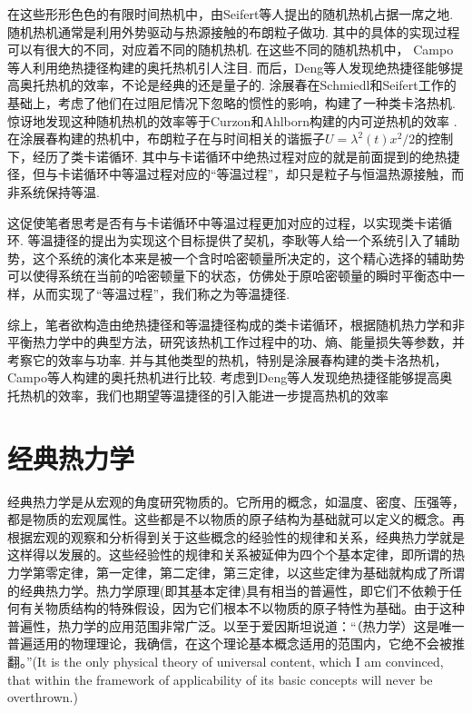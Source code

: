 在这些形形色色的有限时间热机中，由Seifert等人提出的随机热机\cite{Schmiedl2008}占据一席之地. 随机热机通常是利用外势驱动与热源接触的布朗粒子做功. 其中的具体的实现过程可以有很大的不同，对应着不同的随机热机. 在这些不同的随机热机中， Campo等人利用绝热捷径构建的奥托热机\cite{DelCampo2014}引人注目. 而后，Deng等人发现绝热捷径能够提高奥托热机的效率，不论是经典的还是量子的.\cite{Deng2013} 涂展春在Schmiedl和Seifert工作\cite{Schmiedl2008}的基础上，考虑了他们在过阻尼情况下忽略的惯性的影响，构建了一种类卡洛热机\cite{Tu2013}. 惊讶地发现这种随机热机的效率等于Curzon和Ahlborn构建的内可逆热机\cite{Curzon1975}的效率 . 在涂展春构建的热机中\cite{Tu2013}，布朗粒子在与时间相关的谐振子$U=\lambda ^2\left( t \right) x^2/2$的控制下，经历了类卡诺循环. 其中与卡诺循环中绝热过程对应的就是前面提到的绝热捷径，但与卡诺循环中等温过程对应的“等温过程”，却只是粒子与恒温热源接触，而非系统保持等温. 

这促使笔者思考是否有与卡诺循环中等温过程更加对应的过程，以实现类卡诺循环. 等温捷径\cite{Li2016}的提出为实现这个目标提供了契机，李耿等人给一个系统引入了辅助势，这个系统的演化本来是被一个含时哈密顿量所决定的，这个精心选择的辅助势可以使得系统在当前的哈密顿量下的状态，仿佛处于原哈密顿量的瞬时平衡态中一样，从而实现了“等温过程”，我们称之为等温捷径.

综上，笔者欲构造由绝热捷径和等温捷径构成的类卡诺循环，根据随机热力学和非平衡热力学中的典型方法，研究该热机工作过程中的功、熵、能量损失等参数，并考察它的效率与功率. 并与其他类型的热机，特别是涂展春构建的类卡洛热机\cite{Tu2013}，Campo等人构建的奥托热机\cite{DelCampo2014}进行比较. 考虑到Deng等人发现绝热捷径能够提高奥托热机的效率\cite{Deng2013}，我们也期望等温捷径的引入能进一步提高热机的效率


\section{经典热力学}

\quad 经典热力学是从宏观的角度研究物质的。它所用的概念，如温度、密度、压强等，都是物质的宏观属性。这些都是不以物质的原子结构为基础就可以定义的概念。再根据宏观的观察和分析得到关于这些概念的经验性的规律和关系，经典热力学就是这样得以发展的。这些经验性的规律和关系被延伸为四个个基本定律，即所谓的热力学第零定律，第一定律，第二定律，第三定律，以这些定律为基础就构成了所谓的经典热力学。热力学原理(即其基本定律)具有相当的普遍性，即它们不依赖于任何有关物质结构的特殊假设，因为它们根本不以物质的原子特性为基础。由于这种普遍性，热力学的应用范围非常广泛。以至于爱因斯坦说道\cite{schilpp1979albert}：“（热力学）这是唯一普遍适用的物理理论，我确信，在这个理论基本概念适用的范围内，它绝不会被推翻。”(It is the only physical theory of universal
content, which I am convinced, that within the framework
of applicability of its basic concepts will never be
overthrown.)


